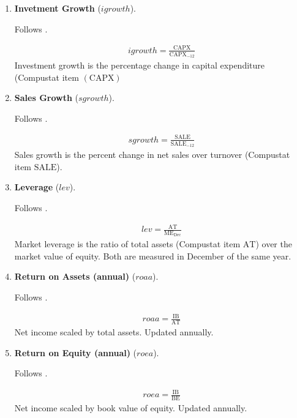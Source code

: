 \begin{enumerate}
	
	
	\item \textbf{Invetment Growth} ($igrowth$). 
	
	Follows . 
	
	\begin{align*}
		igrowth = \frac{ \mathrm{CAPX} }{ \mathrm{CAPX}_{-12} }
	\end{align*}
	Investment growth is the percentage change in capital expenditure (Compustat item $(\mathrm{CAPX})$
	
	
	
	\item \textbf{Sales Growth} ($sgrowth$).
	
	Follows .
	
	\begin{align*}
		sgrowth = \frac{ \mathrm{SALE} }{ \mathrm{SALE}_{-12} }
	\end{align*}
	Sales growth is the percent change in net sales over turnover (Compustat item $\mathrm{SALE}$).
	
	
	
	\item \textbf{Leverage} ($lev$). 
	
	Follows . 
	
	\begin{align*}
		lev = \frac{ \mathrm{AT} }{ \mathrm{ME}_{\text{Dec}} }
	\end{align*}
	Market leverage is the ratio of total assets (Compustat item $\mathrm{AT}$) over the market value of equity. Both are measured in December of the same year.
	
	
	
	\item \textbf{Return on Assets (annual)} ($roaa$).
	
	Follows . 
	
	\begin{align*}
		roaa = \frac{ \mathrm{IB} }{ \mathrm{AT} }
	\end{align*}
	Net income scaled by total assets. Updated annually.
	
	
	
	\item \textbf{Return on Equity (annual)} ($roea$). 
	
	Follows . 
	
	\begin{align*}
		roea = \frac{ \mathrm{IB} }{ \mathrm{BE} }
	\end{align*}
	Net income scaled by book value of equity. Updated annually.
	

\end{enumerate}
